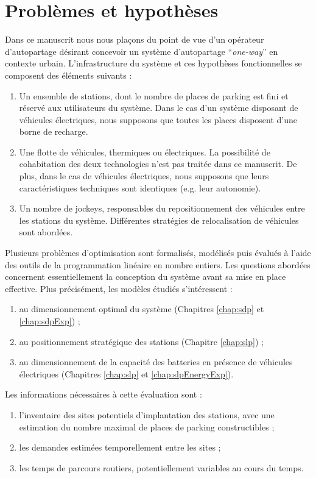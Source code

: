 \section*{Problèmes et hypothèses}

Dans ce manuscrit nous nous plaçons du point de vue d'un opérateur d'autopartage désirant concevoir un système d'autopartage ``\emph{one-way}'' en contexte urbain.
L’infrastructure du système et ces hypothèses fonctionnelles se composent des éléments suivants :
\begin{enumerate}
\item
Un ensemble de stations, dont le nombre de places de parking est fini et réservé aux utilisateurs du système.
Dans le cas d’un système disposant de véhicules électriques, nous supposons que toutes les places disposent d’une borne de recharge.
\item
Une flotte de véhicules, thermiques ou électriques.
La possibilité de cohabitation des deux technologies n’est pas traitée dans ce manuscrit.
De plus, dans le cas de véhicules électriques, nous supposons que leurs caractéristiques techniques sont identiques (e.g. leur autonomie).
\item
Un nombre de jockeys, responsables du repositionnement des véhicules entre les stations du système.
Différentes stratégies de relocalisation de véhicules sont abordées.
\end{enumerate}

\medskip
Plusieurs problèmes d'optimisation sont formalisés, modélisés puis évalués à l'aide des outils de la programmation linéaire en nombre entiers.
Les questions abordées concernent essentiellement la conception du système avant sa mise en place effective.
Plus précisément, les modèles étudiés s'intéressent :
\begin{enumerate}
\item au dimensionnement optimal du système (Chapitres \ref{chap:sdp} et \ref{chap:sdpExp}) ;
\item au positionnement stratégique des stations (Chapitre \ref{chap:slp}) ;
\item au dimensionnement de la capacité des batteries en présence de véhicules électriques (Chapitres \ref{chap:slp} et \ref{chap:slpEnergyExp}).
\end{enumerate}


\noindent Les informations nécessaires à cette évaluation sont : 
\begin{enumerate}
\item 
l’inventaire des sites potentiels d’implantation des stations, avec une estimation du nombre maximal de places de parking constructibles ;
\item
les demandes estimées temporellement entre les sites ;
\item 
les temps de parcours routiers, potentiellement variables au cours du temps.
\end{enumerate}

